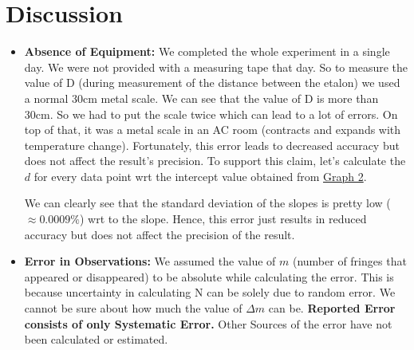 \section{Discussion}

\begin{itemize}
	\item \textbf{Absence of Equipment:} We completed the whole experiment in a single day. We were not provided with a measuring tape that day. So to measure the value of D (during measurement of the distance between the etalon) we used a normal 30cm metal scale. We can see that the value of D is more than 30cm. So we had to put the scale twice which can lead to a lot of errors. On top of that, it was a metal scale in an AC room (contracts and expands with temperature change). Fortunately, this error leads to decreased accuracy but does not affect the result's precision. To support this claim, let's calculate the $d$ for every data point wrt the intercept value obtained from \hyperref[graph:2]{Graph 2}.
	
	We can clearly see that the standard deviation of the slopes is pretty low ($\approx 0.0009\%$) wrt to the slope. Hence, this error just results in reduced accuracy but does not affect the precision of the result.
	
	\item \textbf{Error in Observations:} We assumed the value of $m$ (number of fringes that appeared or disappeared) to be absolute while calculating the error. This is because uncertainty in calculating N can be solely due to random error. We cannot be sure about how much the value of $\Delta m$ can be. \textbf{Reported Error consists of only Systematic Error.} Other Sources of the error have not been calculated or estimated.

\end{itemize}